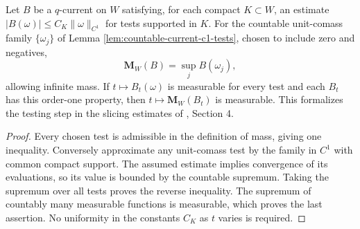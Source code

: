 \begin{proposition}\label{prop:order-one-countable-mass}
Let $B$ be a $q$-current on $W$ satisfying, for each compact $K\subset W$, an estimate $|B(\omega)|\leq C_K\|\omega\|_{C^1}$ for tests supported in $K$. For the countable unit-comass family $\{\omega_j\}$ of Lemma \ref{lem:countable-current-c1-tests}, chosen to include zero and negatives,
\[
 \mathbf M_W(B)=\sup_j B(\omega_j),
\]
allowing infinite mass. If $t\mapsto B_t(\omega)$ is measurable for every test and each $B_t$ has this order-one property, then $t\mapsto\mathbf M_W(B_t)$ is measurable. This formalizes the testing step in the slicing estimates of \cite{Sim18}, Section 4.
\end{proposition}
\begin{proof}
Every chosen test is admissible in the definition of mass, giving one inequality. Conversely approximate any unit-comass test by the family in $C^1$ with common compact support. The assumed estimate implies convergence of its evaluations, so its value is bounded by the countable supremum. Taking the supremum over all tests proves the reverse inequality. The supremum of countably many measurable functions is measurable, which proves the last assertion. No uniformity in the constants $C_K$ as $t$ varies is required.
\end{proof}
